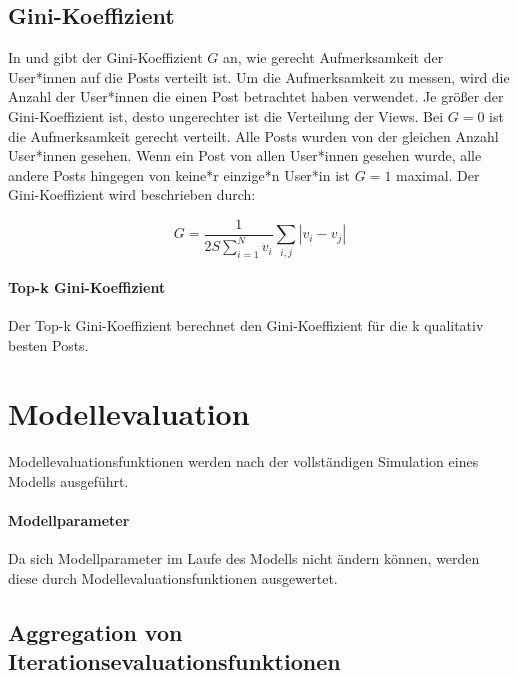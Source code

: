 \subsection{Gini-Koeffizient}

In \cite{Lerman2014} und \cite{Salganik2006854} gibt der Gini-Koeffizient $G$ an, wie gerecht Aufmerksamkeit der User*innen auf die Posts verteilt ist.
Um die Aufmerksamkeit zu messen, wird die Anzahl der User*innen die einen Post betrachtet haben verwendet. Je größer der Gini-Koeffizient ist, desto ungerechter ist die Verteilung der Views. 
Bei $G = 0$ ist die Aufmerksamkeit gerecht verteilt. Alle Posts wurden von der gleichen Anzahl User*innen gesehen. Wenn ein Post von allen User*innen gesehen wurde, alle andere Posts hingegen von keine*r einzige*n User*in ist $G = 1$ maximal. Der Gini-Koeffizient wird beschrieben durch:

\begin{equation}
G = \frac{1}{2S\sum_{i = 1}^{N}v_{i}}\sum_{i,j}|v_{i} - v_{j} |
\end{equation}

\paragraph{Top-k Gini-Koeffizient}

Der Top-k Gini-Koeffizient berechnet den Gini-Koeffizient für die k qualitativ besten Posts.



\section{Modellevaluation}

Modellevaluationsfunktionen werden nach der vollständigen Simulation eines Modells ausgeführt.

\paragraph{Modellparameter} 

Da sich Modellparameter im Laufe des Modells nicht ändern können, werden diese durch Modellevaluationsfunktionen ausgewertet.

\subsection{Aggregation von Iterationsevaluationsfunktionen}

